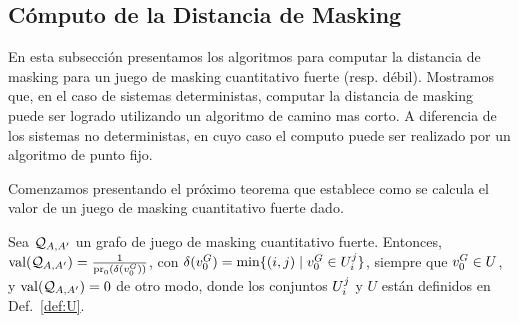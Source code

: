 \subsection{Cómputo de la Distancia de Masking}

En esta subsección presentamos los algoritmos para computar la distancia de masking para un juego de masking cuantitativo fuerte (resp. débil). Mostramos que, en el caso de sistemas deterministas, computar la distancia de masking puede ser logrado utilizando un algoritmo de camino mas corto. A diferencia de los sistemas no deterministas, en cuyo caso el computo puede ser realizado por un algoritmo de punto fijo.

Comenzamos presentando el próximo teorema que establece como se calcula el valor de un juego de masking cuantitativo fuerte dado.
%
\begin{thm} \label{thm:quant_game}
  Sea $\mathcal{Q}_{A, A'}$ un grafo de juego de masking cuantitativo fuerte.
  \sloppy Entonces, $\operatorname{val}(\mathcal{Q}_{A, A'}) = \frac{1}{\operatorname{pr}_{0}(\delta(v_0^G))}$, con
  $\delta(v_0^G) = \min \{ (i,j) \mid  v_0^G \in U^j_i \}$, siempre que
  $v_0^G \in U$, y $\operatorname{val}(\mathcal{Q}_{A, A'})=0$ de otro modo, donde los conjuntos
   $U^j_i$ y $U$ están definidos en Def.~\ref{def:U}.

\end{thm}
